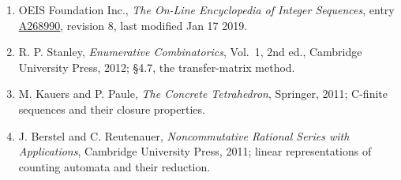 \documentclass[11pt]{article}
\theoremstyle{definition}
\begin{document}
\begin{enumerate}

\item OEIS Foundation Inc., \emph{The On-Line Encyclopedia of Integer Sequences}, entry \href{https://oeis.org/A268990}{A268990}, revision 8, last modified Jan 17 2019.

\item R. P. Stanley, \emph{Enumerative Combinatorics}, Vol.~1, 2nd ed., Cambridge University Press, 2012; \S4.7, the transfer-matrix method.

\item M. Kauers and P. Paule, \emph{The Concrete Tetrahedron}, Springer, 2011; C-finite sequences and their closure properties.

\item J. Berstel and C. Reutenauer, \emph{Noncommutative Rational Series with Applications}, Cambridge University Press, 2011; linear representations of counting automata and their reduction.

\end{enumerate}
\end{document}
